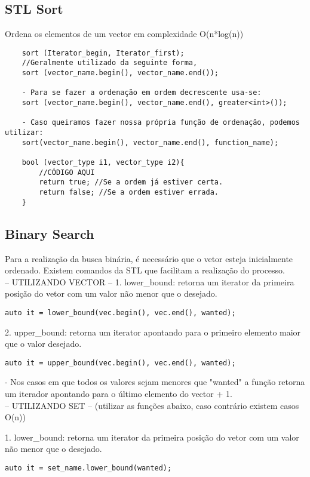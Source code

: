 \subsection{STL Sort}
    Ordena os elementos de um vector em complexidade O(n*log(n))
\begin{verbatim}
    sort (Iterator_begin, Iterator_first);
    //Geralmente utilizado da seguinte forma,
    sort (vector_name.begin(), vector_name.end());

    - Para se fazer a ordenação em ordem decrescente usa-se:
    sort (vector_name.begin(), vector_name.end(), greater<int>());

    - Caso queiramos fazer nossa própria função de ordenação, podemos utilizar:
    sort(vector_name.begin(), vector_name.end(), function_name);

    bool (vector_type i1, vector_type i2){
        //CÓDIGO AQUI
        return true; //Se a ordem já estiver certa.
        return false; //Se a ordem estiver errada.
    }
\end{verbatim}

\subsection{Binary Search}
Para a realização da busca binária, é necessário que o vetor esteja inicialmente ordenado. Existem comandos da STL que facilitam a realização do processo.\\

-- UTILIZANDO VECTOR --
1. lower\_bound: retorna um iterator da primeira posição do vetor com um valor não menor que o desejado.
\begin{verbatim}
auto it = lower_bound(vec.begin(), vec.end(), wanted);
\end{verbatim}

2. upper\_bound: retorna um iterator apontando para o primeiro elemento maior que o valor desejado.
\begin{verbatim}
auto it = upper_bound(vec.begin(), vec.end(), wanted);
\end{verbatim}
- Nos casos em que todos os valores sejam menores que "wanted" a função retorna um iterador apontando para o último elemento do vector + 1.\\

-- UTILIZANDO SET -- (utilizar as funções abaixo, caso contrário existem casos O(n))

1. lower\_bound: retorna um iterator da primeira posição do vetor com um valor não menor que o desejado.
\begin{verbatim}
auto it = set_name.lower_bound(wanted);
\end{verbatim}

